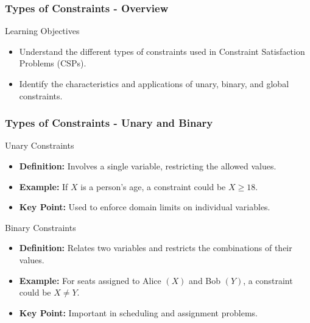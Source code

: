 \documentclass[aspectratio=169]{beamer}
\begin{document}
\begin{frame}[fragile]
    \frametitle{Types of Constraints - Overview}
    \begin{block}{Learning Objectives}
        \begin{itemize}
            \item Understand the different types of constraints used in Constraint Satisfaction Problems (CSPs).
            \item Identify the characteristics and applications of unary, binary, and global constraints.
        \end{itemize}
    \end{block}
\end{frame}

\begin{frame}[fragile]
    \frametitle{Types of Constraints - Unary and Binary}
    \begin{block}{Unary Constraints}
        \begin{itemize}
            \item \textbf{Definition:} Involves a single variable, restricting the allowed values.
            \item \textbf{Example:} If \( X \) is a person's age, a constraint could be \( X \geq 18 \).
            \item \textbf{Key Point:} Used to enforce domain limits on individual variables.
        \end{itemize}
    \end{block}

    \begin{block}{Binary Constraints}
        \begin{itemize}
            \item \textbf{Definition:} Relates two variables and restricts the combinations of their values.
            \item \textbf{Example:} For seats assigned to Alice \( (X) \) and Bob \( (Y) \), a constraint could be \( X \neq Y \).
            \item \textbf{Key Point:} Important in scheduling and assignment problems.
        \end{itemize}
    \end{block}
\end{frame}
\end{document}
